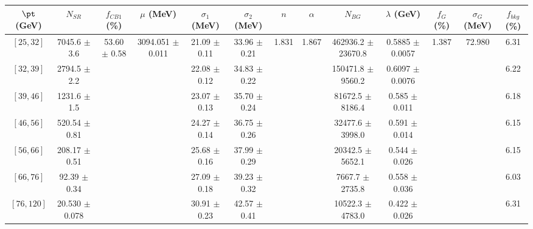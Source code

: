 \begin{tabular}{c||c|c|c|c|c|c|c|c|c|c|c||c}
$\pt$ (GeV) & $N_{SR}$ & $f_{CB1}$ (\%) & $\mu$ (MeV) & $\sigma_1$ (MeV) & $\sigma_2$ (MeV) & $n$ & $\alpha$ & $N_{BG}$ & $\lambda$ (GeV) & $f_G$ (\%) & $\sigma_G$ (MeV) & $f_{bkg}$ (\%) \\
\hline
$[25, 32]$ & 7045.6 $\pm$ 3.6 & \multirow{7}{*}{53.60 $\pm$ 0.58} & \multirow{7}{*}{3094.051 $\pm$ 0.011} & 21.09 $\pm$ 0.11 & 33.96 $\pm$ 0.21 & \multirow{7}{*}{1.831} & \multirow{7}{*}{1.867} & 462936.2 $\pm$ 23670.8 & 0.5885 $\pm$ 0.0057 & \multirow{7}{*}{1.387} & \multirow{7}{*}{72.980} & 6.31\\
$[32, 39]$ & 2794.5 $\pm$ 2.2 &  &  & 22.08 $\pm$ 0.12 & 34.83 $\pm$ 0.22 &  &  & 150471.8 $\pm$ 9560.2 & 0.6097 $\pm$ 0.0076 &  &  & 6.22\\
$[39, 46]$ & 1231.6 $\pm$ 1.5 &  &  & 23.07 $\pm$ 0.13 & 35.70 $\pm$ 0.24 &  &  & 81672.5 $\pm$ 8186.4 & 0.585 $\pm$ 0.011 &  &  & 6.18\\
$[46, 56]$ & 520.54 $\pm$ 0.81 &  &  & 24.27 $\pm$ 0.14 & 36.75 $\pm$ 0.26 &  &  & 32477.6 $\pm$ 3998.0 & 0.591 $\pm$ 0.014 &  &  & 6.15\\
$[56, 66]$ & 208.17 $\pm$ 0.51 &  &  & 25.68 $\pm$ 0.16 & 37.99 $\pm$ 0.29 &  &  & 20342.5 $\pm$ 5652.1 & 0.544 $\pm$ 0.026 &  &  & 6.15\\
$[66, 76]$ & 92.39 $\pm$ 0.34 &  &  & 27.09 $\pm$ 0.18 & 39.23 $\pm$ 0.32 &  &  & 7667.7 $\pm$ 2735.8 & 0.558 $\pm$ 0.036 &  &  & 6.03\\
$[76, 120]$ & 20.530 $\pm$ 0.078 &  &  & 30.91 $\pm$ 0.23 & 42.57 $\pm$ 0.41 &  &  & 10522.3 $\pm$ 4783.0 & 0.422 $\pm$ 0.026 &  &  & 6.31\\
\end{tabular}
